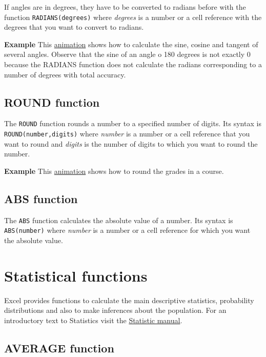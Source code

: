 If angles are in degrees, they have to be converted to radians before with the function \texttt{RADIANS(degrees)} where \emph{degrees} is a number or a cell reference with the degrees that you want to convert to radians.

\textbf{Example} This \href{http://aprendeconalf.es/office/excel/manual/img/example_function_sin_cos_tan.gif}{animation} shows how to calculate the sine, cosine and tangent of several angles. Observe that the sine of an angle o 180 degrees is not exactly 0 because the RADIANS function does not calculate the radians corresponding to a number of degrees with total accuracy.

\subsection{ROUND function}\hypertarget{round-function}{}\label{round-function}

The \texttt{ROUND} function rounds a number to a specified number of digits. Its syntax is \texttt{ROUND(number,digits)} where \emph{number} is a number or a cell reference that you want to round and \emph{digits} is the number of digits to which you want to round the number.

\textbf{Example} This \href{http://aprendeconalf.es/office/excel/manual/img/example_function_round.gif}{animation} shows how to round the grades in a course.

\subsection{ABS function}\hypertarget{abs-function}{}\label{abs-function}

The \texttt{ABS} function calculates the absolute value of a number. Its syntax is \texttt{ABS(number)} where \emph{number} is a number or a cell reference for which you want the absolute value.

\section{Statistical functions}\hypertarget{statistical-functions}{}\label{statistical-functions}

Excel provides functions to calculate the main descriptive statistics, probability distributions and also to make inferences about the population. 
For an introductory text to Statistics visit the \href{/estadistica/manual/}{Statistic manual}.

\subsection{AVERAGE function}\hypertarget{average-function}{}\label{average-function}

